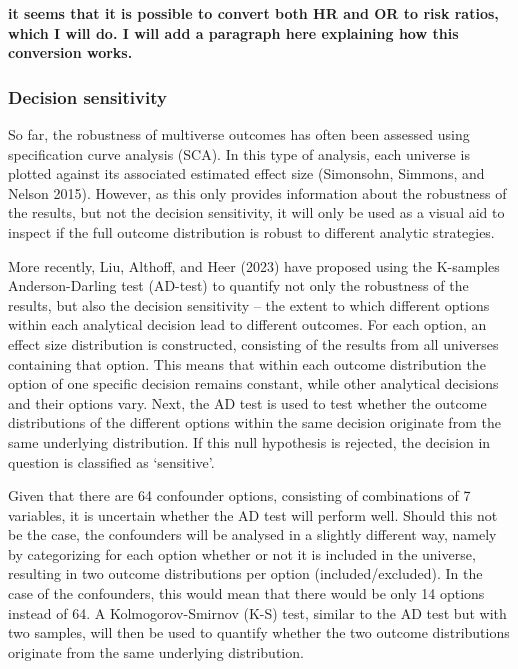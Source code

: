 \documentclass[
  letterpaper,
  DIV=11,
  numbers=noendperiod]{scrartcl}
\begin{document}
\textbf{it seems that it is possible to convert both HR and OR to risk
ratios, which I will do. I will add a paragraph here explaining how this
conversion works.}

\subsubsection{Decision sensitivity}\label{decision-sensitivity}

So far, the robustness of multiverse outcomes has often been assessed
using specification curve analysis (SCA). In this type of analysis, each
universe is plotted against its associated estimated effect size
(Simonsohn, Simmons, and Nelson 2015). However, as this only provides
information about the robustness of the results, but not the decision
sensitivity, it will only be used as a visual aid to inspect if the full
outcome distribution is robust to different analytic strategies.

More recently, Liu, Althoff, and Heer (2023) have proposed using the
K-samples Anderson-Darling test (AD-test) to quantify not only the
robustness of the results, but also the decision sensitivity -- the
extent to which different options within each analytical decision lead
to different outcomes. For each option, an effect size distribution is
constructed, consisting of the results from all universes containing
that option. This means that within each outcome distribution the option
of one specific decision remains constant, while other analytical
decisions and their options vary. Next, the AD test is used to test
whether the outcome distributions of the different options within the
same decision originate from the same underlying distribution. If this
null hypothesis is rejected, the decision in question is classified as
`sensitive'.

Given that there are 64 confounder options, consisting of combinations
of 7 variables, it is uncertain whether the AD test will perform well.
Should this not be the case, the confounders will be analysed in a
slightly different way, namely by categorizing for each option whether
or not it is included in the universe, resulting in two outcome
distributions per option (included/excluded). In the case of the
confounders, this would mean that there would be only 14 options instead
of 64. A Kolmogorov-Smirnov (K-S) test, similar to the AD test but with
two samples, will then be used to quantify whether the two outcome
distributions originate from the same underlying distribution.
\end{document}
